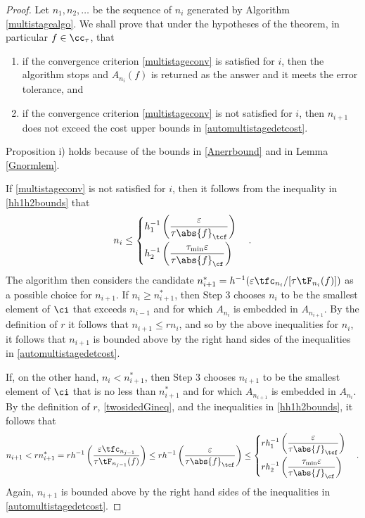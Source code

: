 \documentclass[]{elsarticle}
\theoremstyle{definition}
\theoremstyle{remark}
\newcommand{\Fnorm}[1]{\abs{#1}_{\cf}}
\newcommand{\Ftnorm}[1]{\abs{#1}_{\tcf}}
\begin{document}
\begin{proof} Let $n_1, n_2, \ldots$ be the sequence of $n_i$ generated by Algorithm \ref{multistagealgo}.  We shall prove that under the hypotheses of the theorem, in particular $f \in \cc_{\tau}$, that
\begin{enumerate}
\renewcommand{\labelenumi}{\roman{enumi})}
\item if the convergence criterion \eqref{multistageconv} is satisfied for $i$, then the algorithm stops and $A_{n_i}(f)$ is returned as the answer and it meets the error tolerance, and

\item if the convergence criterion \eqref{multistageconv} is not satisfied for $i$, then $n_{i+1}$ does not exceed the cost upper bounds in \eqref{automultistagedetcost}.

\end{enumerate}
Proposition i) holds because of the bounds in \eqref{Anerrbound} and in Lemma \ref{Gnormlem}.

If \eqref{multistageconv} is not satisfied for $i$, then it follows from  the inequality in \eqref{hh1h2bounds} that 
\[
n_{i} \le 
\begin{cases} 
\displaystyle h_1^{-1}\left(\frac{\varepsilon}{\tau\Ftnorm{f}}\right) \\[2ex]
\displaystyle h_2^{-1}\left(\frac{\tau_{\min}\varepsilon}{\tau\Fnorm{f}}\right)
\end{cases} .
\] 
The algorithm then considers the candidate $n^*_{i+1} = h^{-1}(\varepsilon \tfc_{n_{i}}/[\tau \tF_{n_{i}}(f)])$ as a possible choice for $n_{i+1}$.  If $n_{i} \ge n^*_{i+1}$, then Step 3 chooses $n_{i}$ to be the smallest element of $\ci$ that exceeds $n_{i-1}$ and for which $A_{n_{i}}$ is embedded in $A_{n_{i+1}}$.  By the definition of $r$ it follows that $n_{i+1} \le r  n_{i}$, and so by the above inequalities for $n_{i}$, it follows that $n_{i+1}$ is bounded above by the right hand sides of the inequalities in \eqref{automultistagedetcost}.

If, on the other hand, $n_{i} < n^*_{i+1}$, then Step 3 chooses $n_{i+1}$ to be the smallest element of $\ci$ that is no less than $n^*_{i+1}$ and for which $A_{n_{i+1}}$ is embedded in $A_{n_i}$.  By the definition of $r$, \eqref{twosidedGineq}, and the inequalities in \eqref{hh1h2bounds}, it follows that
\begin{equation*}
n_{i+1} < r n^*_{i+1} = r h^{-1}\left(\frac{\varepsilon \tfc_{n_{j-1}}}{\tau \tF_{n_{j-1}}(f)}\right) \le r  h^{-1}\left(\frac{\varepsilon}{\tau \Ftnorm{f}}\right) \le
\begin{cases}
\displaystyle  rh_1^{-1}\left(\frac{\varepsilon}{\tau \Ftnorm{f}} \right) \\[2ex]
\displaystyle rh_2^{-1}\left(\frac{\tau_{\min}\varepsilon}{\tau \Fnorm{f}} \right)
\end{cases}.
\end{equation*}
Again, $n_{i+1}$ is bounded above by the right hand sides of the inequalities in \eqref{automultistagedetcost}.


\end{proof}
\end{document}

